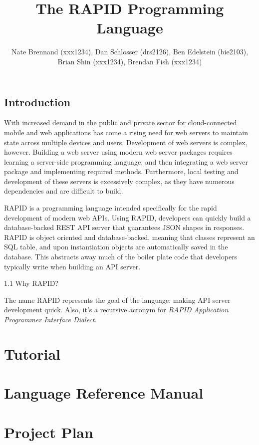 \documentclass[11pt]{article}
\author{Nate Brennand (xxx1234), Dan Schlosser (drs2126), Ben Edelstein (bie2103), Brian Shin (xxx1234), Brendan Fish (xxx1234)}
\title{The RAPID Programming Language}
\begin{document}
\setlength{\parskip}{.1 in}

\maketitle
\newpage

\subsection*{Introduction}

With increased demand in the public and private sector for cloud-connected mobile and web applications has come a rising need for web servers to maintain state across multiple devices and users. Development of web servers is complex, however. Building a web server using modern web server packages requires learning a server-side programming language, and then integrating a web server package and implementing required methods. Furthermore, local testing and development of these servers is excessively complex, as they have numerous dependencies and are difficult to build.

RAPID is a programming language intended specifically for the rapid development of modern web APIs. Using RAPID, developers can quickly build a database-backed REST API server that guarantees JSON shapes in responses. RAPID is object oriented and database-backed, meaning that classes represent an SQL table, and upon instantiation objects are automatically saved in the database. This abstracts away much of the boiler plate code that developers typically write when building an API server. 

1.1 Why RAPID?

The name RAPID represents the goal of the language: making API server development quick. Also, it's a recursive acronym for \textit{RAPID Application Programmer Interface Dialect}.

\section*{Tutorial}
 \newpage

\section*{Language Reference Manual}
 \newpage

\section*{Project Plan}
 \newpage
\end{document}
